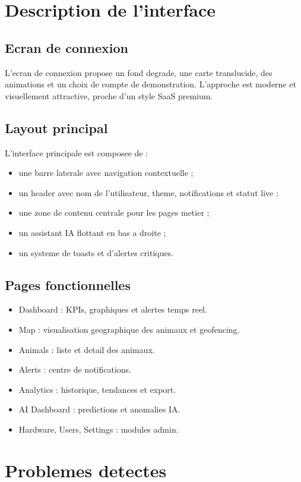\documentclass[11pt,a4paper]{article}
\begin{document}
\section{Description de l'interface}
\subsection{Ecran de connexion}
L'ecran de connexion propose un fond degrade, une carte translucide, des animations et un choix de compte de demonstration. L'approche est moderne et visuellement attractive, proche d'un style SaaS premium.

\subsection{Layout principal}
L'interface principale est composee de :
\begin{itemize}[leftmargin=1.2cm]
  \item une barre laterale avec navigation contextuelle ;
  \item un header avec nom de l'utilisateur, theme, notifications et statut live ;
  \item une zone de contenu centrale pour les pages metier ;
  \item un assistant IA flottant en bas a droite ;
  \item un systeme de toasts et d'alertes critiques.
\end{itemize}

\subsection{Pages fonctionnelles}
\begin{itemize}[leftmargin=1.2cm]
  \item Dashboard : KPIs, graphiques et alertes temps reel.
  \item Map : visualisation geographique des animaux et geofencing.
  \item Animals : liste et detail des animaux.
  \item Alerts : centre de notifications.
  \item Analytics : historique, tendances et export.
  \item AI Dashboard : predictions et anomalies IA.
  \item Hardware, Users, Settings : modules admin.
\end{itemize}

\section{Problemes detectes}
\end{document}
